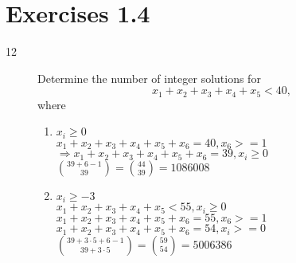 \documentclass[a4paper]{article}
\begin{document}
\section*{Exercises 1.4}
\begin{description}
\item[12]
Determine the number of integer solutions for
\begin{equation*}
    x_1+x_2+x_3+x_4+x_5<40,
\end{equation*}
where
    \begin{enumerate}[label=\alph*)]
      \item $x_i \ge 0 $\\
      $x_1+x_2+x_3+x_4+x_5+x_6=40,x_6>=1$\\
      $\Rightarrow x_1+x_2+x_3+x_4+x_5+x_6=39,x_i\ge 0$\\
      $\binom{39+6-1}{39}=\binom{44}{39}=1086008 $
      \item $x_i \ge -3 $\\
      $x_1+x_2+x_3+x_4+x_5<55,x_i\ge 0$\\
      $x_1+x_2+x_3+x_4+x_5+x_6=55,x_6>=1$\\
      $x_1+x_2+x_3+x_4+x_5+x_6=54,x_i>=0$\\
      $\binom{39+3\cdot5+6-1}{39+3\cdot5}=\binom{59}{54}=5006386 $
    \end{enumerate}


\end{description}
\end{document}
